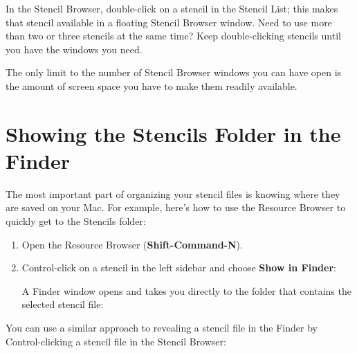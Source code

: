 \documentclass[../main.tex]{subfiles}
\begin{document}
In the Stencil Browser, double-click on a stencil in the Stencil List; this makes that stencil
available in a floating Stencil Browser window. Need to use more than two or three stencils at
the same time? Keep double-clicking stencils until you have the windows you need.


The only limit to the number of Stencil Browser windows you can have open is the amount of
screen space you have to make them readily available.

\section{Showing the Stencils Folder in the Finder}

The most important part of organizing your stencil files is knowing where they are saved on your
Mac. For example, here's how to use the Resource Browser to quickly get to the Stencils
folder:

\begin{enumerate}
  \item Open the Resource Browser (\textbf{Shift-Command-N}).
  \item Control-click on a stencil in the left sidebar and choose \textbf{Show in Finder}:


    A Finder window opens and takes you directly to the folder that contains the selected stencil
    file:

\end{enumerate}

You can use a similar approach to revealing a stencil file in the Finder by Control-clicking a
stencil file in the Stencil Browser:

\end{document}
